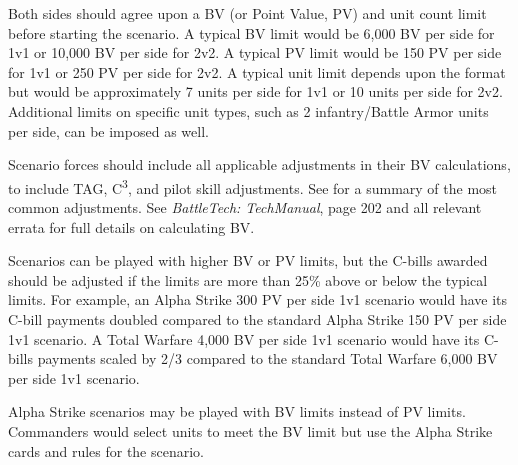Both sides should agree upon a BV (or Point Value, PV) and unit count limit before starting the scenario.
A typical BV limit would be 6,000 BV per side for 1v1 or 10,000 BV per side for 2v2.
A typical PV limit would be 150 PV per side for 1v1 or 250 PV per side for 2v2.
A typical unit limit depends upon the format but would be approximately 7 units per side for 1v1 or 10 units per side for 2v2.
Additional limits on specific unit types, such as 2 infantry/Battle Armor units per side, can be imposed as well.

Scenario forces should include all applicable adjustments in their BV calculations, to include TAG, C\textsuperscript{3}, and pilot skill adjustments.
See \pageref{sec:force_bv_adjustments} for a summary of the most common adjustments.
See \emph{BattleTech: TechManual}, page 202 and all relevant errata for full details on calculating BV.

Scenarios can be played with higher BV or PV limits, but the C-bills awarded should be adjusted if the limits are more than 25\% above or below the typical limits.
For example, an Alpha Strike 300 PV per side 1v1 scenario would have its C-bill payments doubled compared to the standard Alpha Strike 150 PV per side 1v1 scenario.
A Total Warfare 4,000 BV per side 1v1 scenario would have its C-bills payments scaled by 2/3 compared to the standard Total Warfare 6,000 BV per side 1v1 scenario.

Alpha Strike scenarios may be played with BV limits instead of PV limits.
Commanders would select units to meet the BV limit but use the Alpha Strike cards and rules for the scenario.
